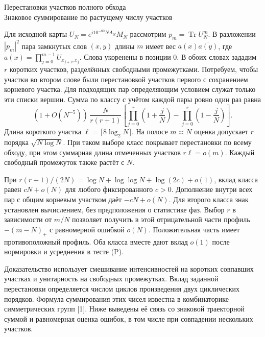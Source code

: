 \documentclass[11pt,a4paper]{article}
\newcommand{\Tr}{\operatorname{Tr}}
\begin{document}
\begin{center}{\LARGE\sffamily Перестановки участков полного обхода}\\[4pt]
{\large Знаковое суммирование по растущему числу участков}
\end{center}
Для исходной карты $U_N=e^{i10^{-80}NA_N}M_N$ рассмотрим $p_m=\Tr U_N^m$. В разложении $|p_m|^2$ пара замкнутых слов $(x,y)$ длины $m$ имеет вес $a(x)\overline{a(y)}$, где $a(x)=\prod_{j=0}^{m-1}U_{x_{j+1},x_j}$. Слова укоренены в позиции 0. В обоих словах зададим $r$ коротких участков, разделённых свободными промежутками. Потребуем, чтобы участки во втором слове были перестановкой участков первого с сохранением корневого участка. Для подходящих пар определяющим условием служат только эти списки вершин. Сумма по классу с учётом каждой пары ровно один раз равна
\[
  (1+O(N^{-5}))\,\frac{N}{r(r+1)}
       \left[\prod_{j=0}^{r}\left(1+\frac jN\right)
                    -\prod_{j=0}^{r}\left(1-\frac jN\right)\right].
                                                                     \tag{1}
\]
Длина короткого участка $\ell=\lceil8\log_2 N\rceil$. На полосе $m\asymp N$ оценка допускает $r$ порядка $\sqrt{N\log N}$. При таком выборе класс покрывает перестановки по всему обходу, при этом суммарная длина отмеченных участков $r\ell=o(m)$. Каждый свободный промежуток также растёт с $N$.

При $r(r+1)/(2N)=\log N+\log\log N+\log(2c)+o(1)$, вклад класса равен $cN+o(N)$ для любого фиксированного $c>0$. Дополнение внутри всех пар с общим корневым участком даёт $-cN+o(N)$. Для второго класса знак установлен вычислением, без предположения о статистике фаз. Выбор $r$ в зависимости от $m/N$ позволяет получить в этой отрицательной части профиль $-(m-N)_+$ с равномерной ошибкой $o(N)$. Положительная часть имеет противоположный профиль. Оба класса вместе дают вклад $o(1)$ после нормировки и усреднения в тесте (P).

Доказательство использует смешивание интенсивностей на коротких совпавших участках и унитарность на свободных промежутках. Вклад заданной перестановки определяется числом циклов произведения двух циклических порядков. Формула суммирования этих чисел известна в комбинаторике симметрических групп [1]. Ниже выведены её связь со знаковой траекторной суммой и равномерная оценка ошибок, в том числе при совпадении нескольких участков.
\end{document}
